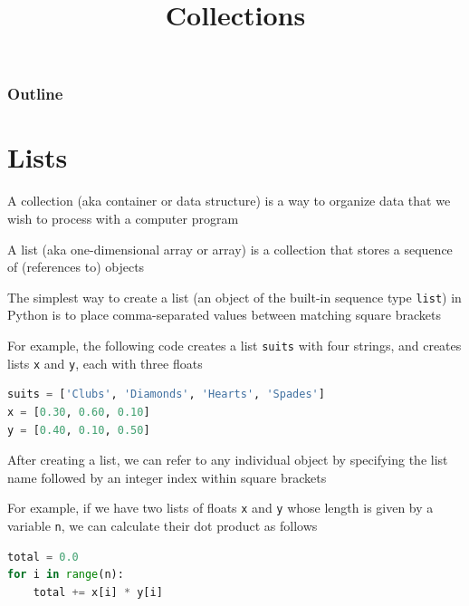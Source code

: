 \documentclass[8pt,a4paper,compress]{beamer}
\title{Collections}
\date{}
\begin{document}
\begin{frame}
\vfill
\titlepage
\end{frame}

\begin{frame}
\frametitle{Outline}
\tableofcontents
\end{frame}

\section{Lists}
\begin{frame}[fragile]
\pause

A collection (aka container or data structure) is a way to organize data that we wish to process with a computer program

\pause
\bigskip

A list (aka one-dimensional array or array) is a collection that stores a sequence of (references to) objects

\pause
\bigskip

The simplest way to create a list (an object of the built-in sequence type \lstinline{list}) in Python is to place comma-separated values between matching square brackets

\pause
\bigskip

For example, the following code creates a list \lstinline{suits} with four strings, and creates lists \lstinline{x} and \lstinline{y}, each with three floats

\begin{lstlisting}[language=Python]
suits = ['Clubs', 'Diamonds', 'Hearts', 'Spades']
x = [0.30, 0.60, 0.10]
y = [0.40, 0.10, 0.50]
\end{lstlisting}

\pause
\bigskip

After creating a list, we can refer to any individual object by specifying the list name followed by an integer index within square brackets

\pause
\bigskip

For example, if we have two lists of floats \lstinline{x} and \lstinline{y} whose length is given by a variable \lstinline{n}, we can calculate their dot product as follows

\begin{lstlisting}[language=Python]
total = 0.0
for i in range(n):
    total += x[i] * y[i]
\end{lstlisting} 
\end{frame}
\end{document}
